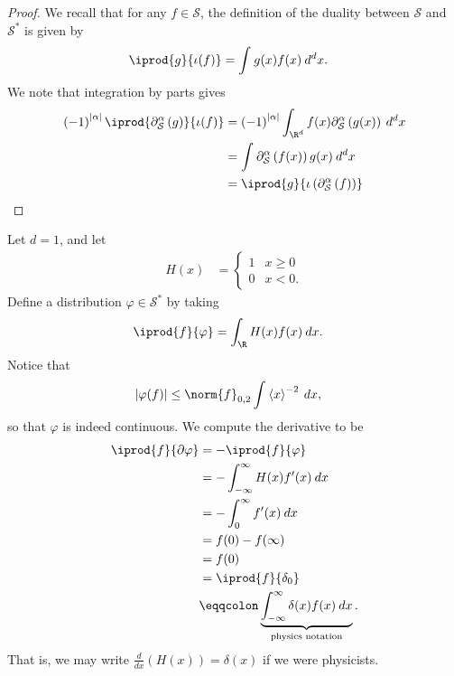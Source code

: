 \documentclass[10pt]{mypackage}
\renewcommand{\eqcolon}{\eqqcolon}
\begin{document}
\begin{proof}
  We recall that for any $f\in \mathcal{S}$, the definition of the duality between $\mathcal{S}$ and $\mathcal{S}^{\ast}$ is given by
  \begin{align*}
    \iprod{g}{\iota(f)} &= \int_{}^{} g(x)f(x)\:d^{d}x.
  \end{align*}
  We note that integration by parts gives
  \begin{align*}
\left( -1 \right)^{\left\vert \alpha \right\vert} \iprod{\partial^{\alpha}_{\mathcal{S}}\left( g \right)}{\iota(f)} &= \left( -1 \right)^{\left\vert \alpha \right\vert}\int_{\R^d}^{} f(x) \partial^{\alpha}_{\mathcal{S}}\left( g(x) \right)\:d^{d}x\\
                                              &= \int_{}^{} \partial^{\alpha}_{\mathcal{S}}\left( f(x) \right)g(x)\:d^{d}x\\
                                              &= \iprod{g}{\iota\left( \partial^{\alpha}_{\mathcal{S}}\left( f \right) \right)}
  \end{align*}
\end{proof}
\begin{example}
  Let $d = 1$, and let
  \begin{align*}
    H(x) &= \begin{cases}
      1 & x\geq 0\\
      0 & x < 0.
    \end{cases}
  \end{align*}
  Define a distribution $\varphi\in \mathcal{S}^{\ast}$ by taking
  \begin{align*}
    \iprod{f}{\varphi} &= \int_{\R}^{} H(x)f(x)\:dx.
  \end{align*}
  Notice that
  \begin{align*}
    \left\vert \varphi(f) \right\vert &\leq \norm{f}_{0,2} \int_{}^{} \left\langle x \right\rangle^{-2}\:dx,
  \end{align*}
  so that $\varphi$ is indeed continuous. We compute the derivative to be
  \begin{align*}
    \iprod{f}{\partial\varphi} &= - \iprod{f}{\varphi}\\
                               &= - \int_{-\infty}^{\infty} H(x)f'(x)\:dx\\
                               &= - \int_{0}^{\infty} f'(x)\:dx\\
                               &= f(0)-f(\infty)\\
                               &= f(0)\\
                               &= \iprod{f}{\delta_0}\\
                               &\eqcolon \underbrace{\int_{-\infty}^{\infty} \delta(x)f(x)\:dx}_{\text{physics notation}}.
  \end{align*}
  That is, we may write $ \frac{d}{dx}\left( H(x) \right) = \delta(x) $ if we were physicists.
\end{example}
\end{document}
